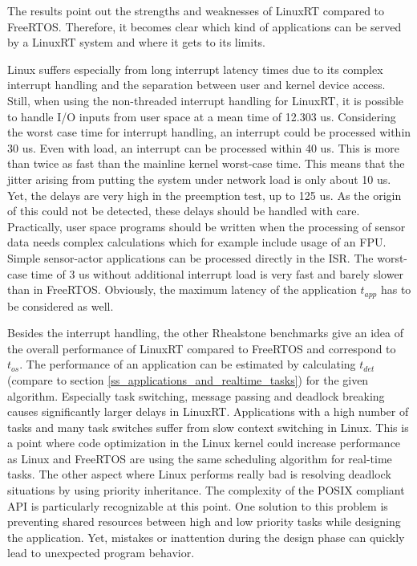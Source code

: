 The results point out the strengths and weaknesses of LinuxRT compared to FreeRTOS.
Therefore, it becomes clear which kind of applications can be served by a LinuxRT system and where it gets to its limits.
\par
Linux suffers especially from long interrupt latency times due to its complex interrupt handling and the separation between user and kernel device access.
Still, when using the non-threaded interrupt handling for LinuxRT, it is possible to handle \ac{I/O} inputs from user space at a mean time of 12.303 us. Considering the worst case time for interrupt handling, an interrupt could be processed within 30 us.
Even with load, an interrupt can be processed within 40 us. 
This is more than twice as fast than the mainline kernel worst-case time.
This means that the jitter arising from putting the system under network load is only about 10 us.
Yet, the delays are very high in the preemption test, up to 125 us.
As the origin of this could not be detected, these delays should be handled with care.
Practically, user space programs should be written when the processing of sensor data needs complex calculations which for example include usage of an \ac{FPU}.
Simple sensor-actor applications can be processed directly in the \ac{ISR}.
The worst-case time of 3 us without additional interrupt load is very fast and barely slower than in FreeRTOS. 
Obviously, the maximum latency of the application $t_{app}$ has to be considered as well.
\par
Besides the interrupt handling, the other Rhealstone benchmarks give an idea of the overall performance of LinuxRT compared to FreeRTOS and correspond to $t_{os}$. 
The performance of an application can be estimated by calculating $t_{det}$ (compare to section \ref{ss_applications_and_realtime_tasks}) for the given algorithm.
Especially task switching, message passing and deadlock breaking causes significantly larger delays in LinuxRT.
Applications with a high number of tasks and many task switches suffer from slow context switching in Linux. 
This is a point where code optimization in the Linux kernel could increase performance as Linux and FreeRTOS are using the same scheduling algorithm for real-time tasks.  
The other aspect where Linux performs really bad is resolving deadlock situations by using priority inheritance.
The complexity of the POSIX compliant \ac{API} is particularly recognizable at this point.
One solution to this problem is preventing shared resources between high and low priority tasks while designing the application. 
Yet, mistakes or inattention during the design phase can quickly lead to unexpected program behavior.
